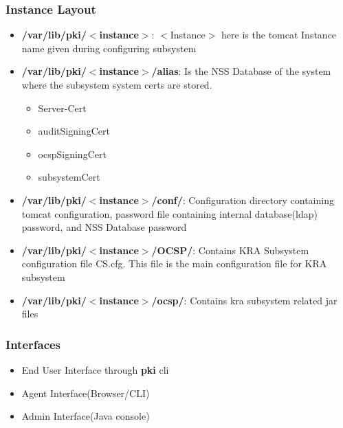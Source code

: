 \documentclass[12pt]{report}
\begin{document}
\subsubsection{Instance Layout}
    \begin{itemize}
        \item \textbf{/var/lib/pki/$<$instance$>$}: $<$Instance$>$ here is the tomcat Instance name 
            given during configuring subsystem
        \item \textbf{/var/lib/pki/$<$instance$>$/alias}: Is the NSS Database of the system where the subsystem system 
            certs are stored. 
        \begin{itemize}
            \item Server-Cert
            \item auditSigningCert
            \item ocspSigningCert
            \item subsystemCert
        \end{itemize}
        \item \textbf{/var/lib/pki/$<$instance$>$/conf/}: Configuration directory containing tomcat configuration,
            password file containing internal database(ldap) password, and NSS Database password
        \item \textbf{/var/lib/pki/$<$instance$>$/OCSP/}: Contains KRA Subsystem configuration file CS.cfg. This file is
            the main configuration file for KRA subsystem
        \item \textbf{/var/lib/pki/$<$instance$>$/ocsp/}: Contains kra subsystem related jar files 
    \end{itemize}
\subsubsection{Interfaces}
\begin{itemize}
    \item End User Interface through \textbf{pki} cli
    \item Agent Interface(Browser/CLI)
    \item Admin Interface(Java console)
\end{itemize}
\end{document}
